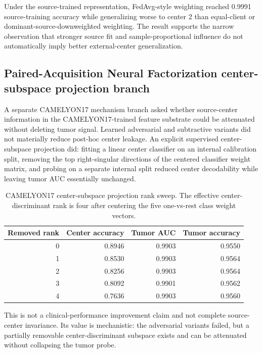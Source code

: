 Under the source-trained representation, FedAvg-style weighting reached 0.9991 source-training accuracy while generalizing worse to center 2 than equal-client or dominant-source-downweighted weighting. The result supports the narrow observation that stronger source fit and sample-proportional influence do not automatically imply better external-center generalization.

\subsection{Paired-Acquisition Neural Factorization center-subspace projection branch}
A separate CAMELYON17 mechanism branch asked whether source-center information in the CAMELYON17-trained feature substrate could be attenuated without deleting tumor signal. Learned adversarial and subtractive variants did not materially reduce post-hoc center leakage. An explicit supervised center-subspace projection did: fitting a linear center classifier on an internal calibration split, removing the top right-singular directions of the centered classifier weight matrix, and probing on a separate internal split reduced center decodability while leaving tumor AUC essentially unchanged.

\begin{table}[!htbp]
\centering
\caption{CAMELYON17 center-subspace projection rank sweep. The effective center-discriminant rank is four after centering the five one-vs-rest class weight vectors.}
\small
\begin{tabular}{rrrr}
\toprule
Removed rank & Center accuracy & Tumor AUC & Tumor accuracy \\
\midrule
0 & 0.8946 & 0.9903 & 0.9550 \\
1 & 0.8530 & 0.9903 & 0.9564 \\
2 & 0.8256 & 0.9903 & 0.9564 \\
3 & 0.8092 & 0.9901 & 0.9562 \\
4 & 0.7636 & 0.9903 & 0.9560 \\
\bottomrule
\end{tabular}
\label{tab:camelyon17_center_projection}
\end{table}
\FloatBarrier

This is not a clinical-performance improvement claim and not complete source-center invariance. Its value is mechanistic: the adversarial variants failed, but a partially removable center-discriminant subspace exists and can be attenuated without collapsing the tumor probe.

